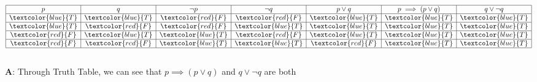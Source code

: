 \documentclass[12pt, letterpaper]{article}
\begin{document}
\begin{displaymath}
    \begin{array}{|c|c|c|c|c|c|c|}
    \hline
    p & q & \neg p & \neg q & p \lor q & p \implies (p \lor q) & q \lor \neg q\\ %
    \hline %
    \textcolor{blue}{T} & \textcolor{blue}{T} & \textcolor{red}{F} & \textcolor{red}{F} & \textcolor{blue}{T} & \textcolor{blue}{T} & \textcolor{blue}{T}\\
    \hline
    \textcolor{blue}{T} & \textcolor{red}{F} & \textcolor{red}{F} & \textcolor{blue}{T} & \textcolor{blue}{T} & \textcolor{blue}{T} & \textcolor{blue}{T}\\
    \hline
    \textcolor{red}{F} & \textcolor{blue}{T} & \textcolor{blue}{T} & \textcolor{red}{F} & \textcolor{blue}{T} & \textcolor{blue}{T} & \textcolor{blue}{T}\\
    \hline
    \textcolor{red}{F} & \textcolor{red}{F} & \textcolor{blue}{T} & \textcolor{blue}{T} & \textcolor{red}{F} & \textcolor{blue}{T} & \textcolor{blue}{T}\\
    \hline
    \end{array}
\end{displaymath} \\

\textbf{A}: Through Truth Table, we can see that $p \implies (p \lor q)$ and $q \lor \neg q$ are both 

\setlength\parindent{40pt}{tautology, which proves that they're Logically Equivalent} \\
\end{document}
